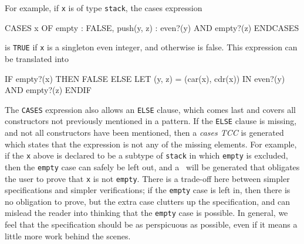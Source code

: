 For example, if \texttt{x} is of type \texttt{stack}, the cases expression
\begin{pvsex}
  CASES x OF
    empty : FALSE,
    push(y, z) : even?(y) AND empty?(z)
  ENDCASES
\end{pvsex}
is \texttt{TRUE} if \texttt{x} is a singleton even integer, and otherwise is
false.  This expression can be translated into
\begin{pvsex}
  IF empty?(x)
     THEN FALSE
     ELSE LET (y, z) = (car(x), cdr(x))
           IN even?(y) AND empty?(z)
  ENDIF
\end{pvsex}

The \texttt{CASES} expression also allows an \texttt{ELSE} clause, which
comes last and covers all constructors not previously mentioned in a
pattern.  If the \texttt{ELSE} clause is missing, and not all constructors
have been mentioned, then a \emph{cases TCC} is generated which states that the expression is not
any of the missing elements.  For example, if the \texttt{x} above is
declared to be a subtype of \texttt{stack} in which \texttt{empty} is
excluded, then the \texttt{empty} case can safely be left out, and a \tcc\
will be generated that obligates the user to prove that \texttt{x} is not
\texttt{empty}.  There is a trade-off here between simpler specifications
and simpler verifications; if the \texttt{empty} case is left in, then
there is no obligation to prove, but the extra case clutters up the
specification, and can mislead the reader into thinking that the
\texttt{empty} case is possible.  In general, we feel that the
specification should be as perspicuous as possible, even if it means a
little more work behind the scenes.
